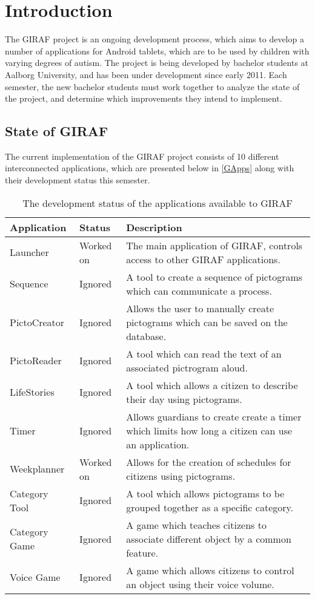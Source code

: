 \chapter{Introduction}
The GIRAF project is an ongoing development process, which aims to develop a
number of applications for Android tablets, which are to be used by children
with varying degrees of autism. The project is being developed by bachelor
students at Aalborg University, and has been under development since early 2011.
Each semester, the new bachelor students must work together to analyze the state
of the project, and determine which improvements they intend to implement.

\section{State of GIRAF}

The current implementation of the GIRAF project consists of 10 different
interconnected applications, which are presented below in \autoref{GApps} along
with their development status this semester.

\begin{table}[H]
\centering
\begin{tabular}{|p{2.8cm}|p{2.2cm}|p{7cm}|}
\hline
Application			& Status & Description \\\hline
Launcher  			& Worked on & The main application of GIRAF, controls access
to other GIRAF applications. \\\hline 
Sequence	       	& Ignored & A tool to create a sequence of pictograms which can
communicate a process.\\\hline 
PictoCreator  	   	& Ignored & Allows the user to manually create pictograms
which can be saved on the database.\\\hline
PictoReader	   		& Ignored & A tool which can read the text of an associated
pictrogram aloud.\\\hline
LifeStories	   		& Ignored & A tool which allows a citizen to describe their day
using pictograms.\\\hline 
Timer     	   		& Ignored & Allows guardians to create create a timer which
limits how long a citizen can use an application.\\\hline 
Weekplanner 		& Worked on & Allows for the creation of schedules for citizens
using pictograms. \\\hline 
Category Tool		& Ignored & A tool which allows pictograms to be grouped together
as a specific category. \\\hline 
Category Game   	& Ignored & A game which teaches citizens to associate
different object by a common feature. \\\hline 
Voice Game  		& Ignored & A game which allows citizens to control an object
using their voice volume. \\\hline
\end{tabular} 
\caption{The development status of the applications available to GIRAF}
\label{GApps}
\end{table}


